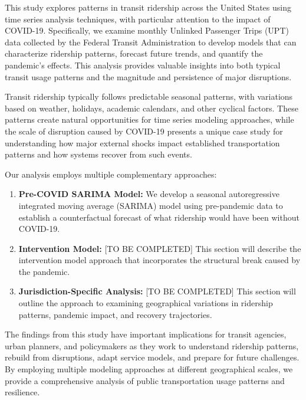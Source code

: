 \documentclass[11pt]{article}
\begin{document}
This study explores patterns in transit ridership across the United States using time series analysis techniques, with particular attention to the impact of COVID-19. Specifically, we examine monthly Unlinked Passenger Trips (UPT) data collected by the Federal Transit Administration to develop models that can characterize ridership patterns, forecast future trends, and quantify the pandemic's effects. This analysis provides valuable insights into both typical transit usage patterns and the magnitude and persistence of major disruptions.

Transit ridership typically follows predictable seasonal patterns, with variations based on weather, holidays, academic calendars, and other cyclical factors. These patterns create natural opportunities for time series modeling approaches, while the scale of disruption caused by COVID-19 presents a unique case study for understanding how major external shocks impact established transportation patterns and how systems recover from such events.

Our analysis employs multiple complementary approaches:

\begin{enumerate}
  \item \textbf{Pre-COVID SARIMA Model:} We develop a seasonal autoregressive integrated moving average (SARIMA) model using pre-pandemic data to establish a counterfactual forecast of what ridership would have been without COVID-19.
  
  \item \textbf{Intervention Model:} [TO BE COMPLETED] This section will describe the intervention model approach that incorporates the structural break caused by the pandemic.
  
  \item \textbf{Jurisdiction-Specific Analysis:} [TO BE COMPLETED] This section will outline the approach to examining geographical variations in ridership patterns, pandemic impact, and recovery trajectories.
\end{enumerate}

The findings from this study have important implications for transit agencies, urban planners, and policymakers as they work to understand ridership patterns, rebuild from disruptions, adapt service models, and prepare for future challenges. By employing multiple modeling approaches at different geographical scales, we provide a comprehensive analysis of public transportation usage patterns and resilience.
\end{document}
